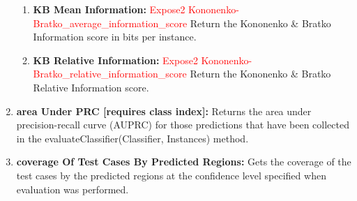 \documentclass[a4paper,12pt, english]{article}
\begin{document}
\begin{enumerate}
\begin{enumerate}
\item \textbf{KB Mean Information: } \textcolor{red}{Expose2 Kononenko-Bratko\_average\_information\_score}
          Return the Kononenko \& Bratko Information score in bits per instance. 
          
\item \textbf{KB Relative Information: } \textcolor{red}{Expose2 Kononenko-Bratko\_relative\_information\_score}
          Return the Kononenko \& Bratko Relative Information score.
\end{enumerate}


\item \textbf{area Under PRC [requires class index]: }
          Returns the area under precision-recall curve (AUPRC) for those predictions that have been collected in the evaluateClassifier(Classifier, Instances) method.
          





          

          

          

          
\item \textbf{coverage Of Test Cases By Predicted Regions: }
          Gets the coverage of the test cases by the predicted regions at the confidence level specified when evaluation was performed.
          

          
          
          



\end{enumerate}
\end{document}
